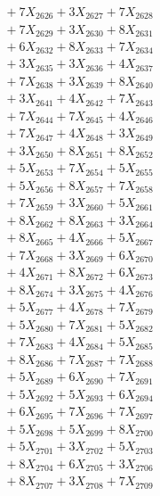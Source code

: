 \documentclass[a4paper,10pt]{article}
\begin{document}
{\begin{align}
&\;  + 7 X_{2626} + 3 X_{2627} + 7 X_{2628} \\[0.3ex]
&\;  + 7 X_{2629} + 3 X_{2630} + 8 X_{2631} \\[0.3ex]
&\;  + 6 X_{2632} + 8 X_{2633} + 7 X_{2634} \\[0.3ex]
&\;  + 3 X_{2635} + 3 X_{2636} + 4 X_{2637} \\[0.3ex]
&\;  + 7 X_{2638} + 3 X_{2639} + 8 X_{2640} \\[0.3ex]
&\;  + 3 X_{2641} + 4 X_{2642} + 7 X_{2643} \\[0.3ex]
&\;  + 7 X_{2644} + 7 X_{2645} + 4 X_{2646} \\[0.3ex]
&\;  + 7 X_{2647} + 4 X_{2648} + 3 X_{2649} \\[0.5ex]\allowbreak
&\;  + 3 X_{2650} + 8 X_{2651} + 8 X_{2652} \\[0.3ex]
&\;  + 5 X_{2653} + 7 X_{2654} + 5 X_{2655} \\[0.3ex]
&\;  + 5 X_{2656} + 8 X_{2657} + 7 X_{2658} \\[0.3ex]
&\;  + 7 X_{2659} + 3 X_{2660} + 5 X_{2661} \\[0.3ex]
&\;  + 8 X_{2662} + 8 X_{2663} + 3 X_{2664} \\[0.3ex]
&\;  + 8 X_{2665} + 4 X_{2666} + 5 X_{2667} \\[0.3ex]
&\;  + 7 X_{2668} + 3 X_{2669} + 6 X_{2670} \\[0.3ex]
&\;  + 4 X_{2671} + 8 X_{2672} + 6 X_{2673} \\[0.3ex]
&\;  + 8 X_{2674} + 3 X_{2675} + 4 X_{2676} \\[0.3ex]
&\;  + 5 X_{2677} + 4 X_{2678} + 7 X_{2679} \\[0.5ex]\allowbreak
&\;  + 5 X_{2680} + 7 X_{2681} + 5 X_{2682} \\[0.3ex]
&\;  + 7 X_{2683} + 4 X_{2684} + 5 X_{2685} \\[0.3ex]
&\;  + 8 X_{2686} + 7 X_{2687} + 7 X_{2688} \\[0.3ex]
&\;  + 5 X_{2689} + 6 X_{2690} + 7 X_{2691} \\[0.3ex]
&\;  + 5 X_{2692} + 5 X_{2693} + 6 X_{2694} \\[0.3ex]
&\;  + 6 X_{2695} + 7 X_{2696} + 7 X_{2697} \\[0.3ex]
&\;  + 5 X_{2698} + 5 X_{2699} + 8 X_{2700} \\[0.3ex]
&\;  + 5 X_{2701} + 3 X_{2702} + 5 X_{2703} \\[0.3ex]
&\;  + 8 X_{2704} + 6 X_{2705} + 3 X_{2706} \\[0.3ex]
&\;  + 8 X_{2707} + 3 X_{2708} + 7 X_{2709} \\[0.5ex]\allowbreak

\end{align}}
\end{document}
